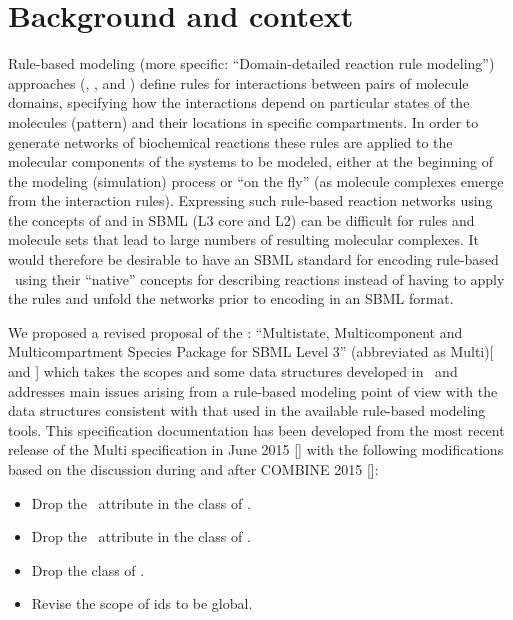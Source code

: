 
\section{Background and context}
\label{def:Background}

Rule-based modeling (more specific: ``Domain-detailed reaction rule modeling'') approaches (, , and ) define rules for interactions between pairs of molecule domains, specifying how the interactions depend on particular states of the molecules (pattern) and their locations in specific compartments. In order to generate networks of biochemical reactions these rules are applied to the molecular components of the systems to be modeled, either at the beginning of the modeling (simulation) process or ``on the fly'' (as molecule complexes emerge from the interaction rules). Expressing such rule-based reaction networks using the concepts of \Species and \Compartment in SBML (L3 core and L2) can be difficult for rules and molecule sets that lead to large numbers of resulting molecular complexes. It would therefore be desirable to have an SBML standard for encoding rule-based \smodels\ using their ``native'' concepts for describing reactions instead of having to apply the rules and unfold the networks prior to encoding in an SBML format.

We proposed a revised proposal of the \multi: ``Multistate, Multicomponent and Multicompartment Species Package for SBML Level 3''  (abbreviated as Multi)[\cite{ref:revisedMulti} and \cite{ref:multiproposal280}] which takes the scopes and some data structures developed in \multiOneProposalWC\ and addresses main issues arising from a rule-based modeling point of view with the data structures consistent with that used in the available rule-based modeling tools. This specification documentation has been developed from the most recent release of the Multi specification in June 2015 [\cite{ref:multispecV104}] with the following modifications based on the discussion during and after COMBINE 2015 [\cite{ref:combine2015}]: 

\begin{itemize}
 \item Drop the \occurAtt\ attribute in the class of \SpeciesTypeInstance.
 \item Drop the \occurAtt\ attribute in the class of \SpeciesTypeComponentIndex.
 \item Drop the class of \DenotedSpeciesTypeComponentIndex.
 \item Revise the scope of \PossibleSpeciesFeatureValue ids to be global.
\end{itemize}


